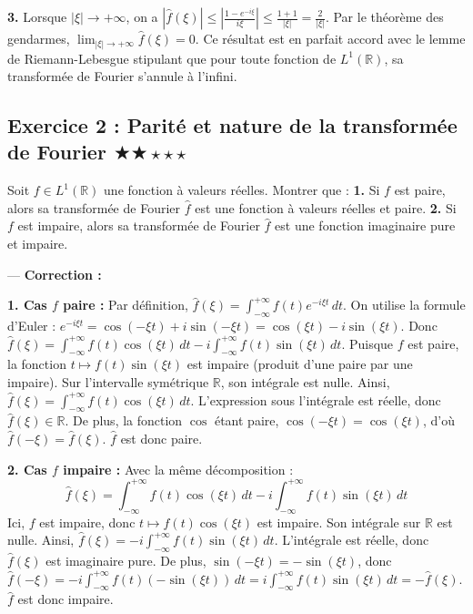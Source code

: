 \documentclass[11pt,a4paper]{article}
\begin{document}
\textbf{3.} Lorsque $|\xi| \to +\infty$, on a $|\hat{f}(\xi)| \le \left|\frac{1 - e^{-i\xi}}{i\xi}\right| \le \frac{1 + 1}{|\xi|} = \frac{2}{|\xi|}$.
Par le théorème des gendarmes, $\lim_{|\xi| \to +\infty} \hat{f}(\xi) = 0$. Ce résultat est en parfait accord avec le lemme de Riemann-Lebesgue stipulant que pour toute fonction de $L^1(\mathbb{R})$, sa transformée de Fourier s'annule à l'infini.


\subsection*{Exercice 2 : Parité et nature de la transformée de Fourier \quad $\bigstar\bigstar\star\star\star$}

Soit $f \in L^1(\mathbb{R})$ une fonction à valeurs réelles.
Montrer que :
\textbf{1.} Si $f$ est paire, alors sa transformée de Fourier $\hat{f}$ est une fonction à valeurs réelles et paire.
\textbf{2.} Si $f$ est impaire, alors sa transformée de Fourier $\hat{f}$ est une fonction imaginaire pure et impaire.

---
\textbf{Correction :}

\textbf{1. Cas $f$ paire :}
Par définition, $\hat{f}(\xi) = \int_{-\infty}^{+\infty} f(t)e^{-i\xi t} \, dt$.
On utilise la formule d'Euler : $e^{-i\xi t} = \cos(-\xi t) + i\sin(-\xi t) = \cos(\xi t) - i\sin(\xi t)$.
Donc $\hat{f}(\xi) = \int_{-\infty}^{+\infty} f(t)\cos(\xi t) \, dt - i \int_{-\infty}^{+\infty} f(t)\sin(\xi t) \, dt$.
Puisque $f$ est paire, la fonction $t \mapsto f(t)\sin(\xi t)$ est impaire (produit d'une paire par une impaire). Sur l'intervalle symétrique $\mathbb{R}$, son intégrale est nulle.
Ainsi, $\hat{f}(\xi) = \int_{-\infty}^{+\infty} f(t)\cos(\xi t) \, dt$.
L'expression sous l'intégrale est réelle, donc $\hat{f}(\xi) \in \mathbb{R}$.
De plus, la fonction $\cos$ étant paire, $\cos(-\xi t) = \cos(\xi t)$, d'où $\hat{f}(-\xi) = \hat{f}(\xi)$. $\hat{f}$ est donc paire.

\textbf{2. Cas $f$ impaire :}
Avec la même décomposition :
$$ \hat{f}(\xi) = \int_{-\infty}^{+\infty} f(t)\cos(\xi t) \, dt - i \int_{-\infty}^{+\infty} f(t)\sin(\xi t) \, dt $$
Ici, $f$ est impaire, donc $t \mapsto f(t)\cos(\xi t)$ est impaire. Son intégrale sur $\mathbb{R}$ est nulle.
Ainsi, $\hat{f}(\xi) = -i \int_{-\infty}^{+\infty} f(t)\sin(\xi t) \, dt$.
L'intégrale est réelle, donc $\hat{f}(\xi)$ est imaginaire pure.
De plus, $\sin(-\xi t) = -\sin(\xi t)$, donc $\hat{f}(-\xi) = -i \int_{-\infty}^{+\infty} f(t)(-\sin(\xi t)) \, dt = i \int_{-\infty}^{+\infty} f(t)\sin(\xi t) \, dt = -\hat{f}(\xi)$. $\hat{f}$ est donc impaire.
\end{document}
